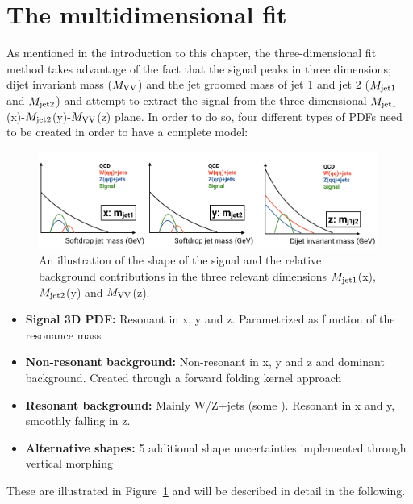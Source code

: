 \section{The multidimensional fit}
As mentioned in the introduction to this chapter, the three-dimensional fit method takes advantage of the fact that the signal peaks in three dimensions; dijet invariant mass ($M_{\rm VV}$) and the jet groomed mass of jet 1 and jet 2 ($M_{\rm jet1}$ and $M_{\rm jet2}$) and attempt to extract the signal from the three dimensional $M_{\rm jet1}$(x)-$M_{\rm jet2}$(y)-$M_{\rm VV}$(z) plane.
In order to do so, four different types of PDFs need to be created in order to have a complete model:
\begin{figure}[h!]
\centering
\includegraphics[width=0.99\textwidth]{figures/analysis/search3/misc/3Dfit.png}
\caption{An illustration of the shape of the signal and the relative background contributions in the three relevant dimensions $M_{\rm jet1}$(x), $M_{\rm jet2}$(y) and $M_{\rm VV}$(z). }
\label{fig:searchIII:3Dfit}
\end{figure}
\begin{itemize}
  \item \textbf{Signal 3D PDF:} Resonant in x, y and z. Parametrized as function of the resonance mass \mX
  \item \textbf{Non-resonant background:} Non-resonant in x, y and z and dominant background. Created through a forward folding kernel approach
  \item \textbf{Resonant background:} Mainly W/Z+jets (some \ttbar). Resonant in x and y, smoothly falling in z.
  \item \textbf{Alternative shapes:} 5 additional shape uncertainties implemented through vertical morphing  
\end{itemize}
These are illustrated in Figure~\ref{fig:searchIII:3Dfit} and will be described in detail in the following.

